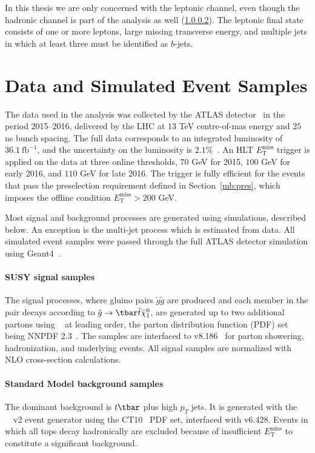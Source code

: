 In this thesis we are only concerned with the leptonic channel, even though the
hadronic channel is part of the analysis as well (\ref{}). The leptonic final
state consists of one or more leptons, large missing transverse energy, and
multiple jets in which at least three must be identified as $b$-jets.

\section{Data and Simulated Event Samples}\label{mbdatasm}

The data used in the analysis was collected by the ATLAS
detector~\cite{PERF-2007-01} in the period 2015--2016, delivered by the LHC at
$13$ TeV centre-of-mas energy and $25$ ns bunch spacing. The full data
corresponds to an integrated luminosity of $36.1~\text{fb}^{-1}$, and the
uncertainty on the luminosity is $2.1\%$~\cite{DAPR-2013-01}. An HLT
$E_{\text{T}}^{\text{miss}}$ trigger is applied on the data at three online
thresholds, $70$ GeV for 2015, $100$ GeV for early 2016, and $110$ GeV for late
2016. The trigger is fully efficient for the events that pass the preselection
requirement defined in Section~\ref{mb:pres}, which imposes the offline
condition $E_{\text{T}}^{\text{miss}} > 200$ GeV.

Most signal and background processes are generated using simulations, described
below. An exception is the multi-jet process which is estimated from data. All
simulated event samples were passed through the full ATLAS detector simulation
using Geant4~\cite{Agostinelli:2002hh}.

\paragraph{SUSY signal samples} The signal processes, where gluino pairs
$\tilde{g}\tilde{g}$ are produced and each member in the pair decays according
to $\tilde{g}\to \tbar\tilde{t}\tilde{\chi}^0_1$, are generated up to two
additional partons using \MGMCatNLO~\cite{Alwall:2014hca} at leading order, the
parton distribution function (PDF) set being NNPDF 2.3~\cite{Ball:2012cx}. The
samples are interfaced to \PYTHIA v8.186~\cite{Sjostrand:2007gs} for parton
showering, hadronization, and underlying events. All signal samples are
normalized with NLO cross-section calculations.


\paragraph{Standard Model background samples} The dominant background is
$t\tbar$ plus high $p_T$ jets. It is generated with the
\POWHEGBOX~\cite{Alioli:2010xd}~v2 event generator using the
CT10~\cite{Lai:2010vv} PDF set, interfaced with \PYTHIA v6.428. Events in which
all tops decay hadronically are excluded because of insufficient
$E_{\text{T}}^{\text{miss}}$ to constitute a significant background.

